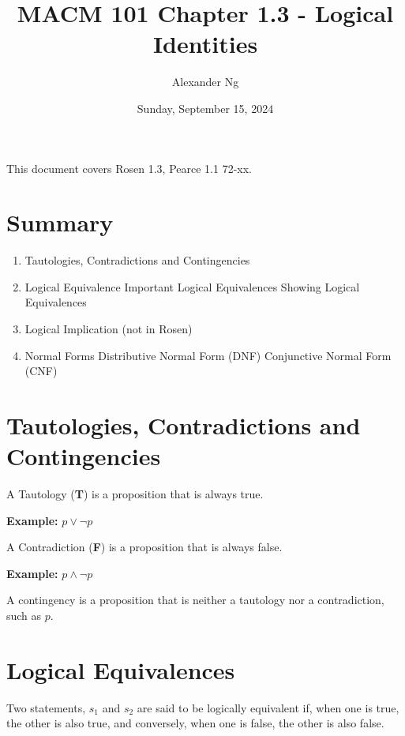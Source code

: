 \documentclass[12pt]{article}
\begin{document}
\title{MACM 101 Chapter 1.3 - Logical Identities}
\author{Alexander Ng}
\date{Sunday, September 15, 2024}

\maketitle

This document covers Rosen 1.3, Pearce 1.1 72-xx.

\section*{Summary}

\begin{enumerate}
\item Tautologies, Contradictions and Contingencies
\item Logical Equivalence
  \subitem Important Logical Equivalences
  \subitem Showing Logical Equivalences
\item Logical Implication (not in Rosen)
\item Normal Forms
  \subitem Distributive Normal Form (DNF)
  \subitem Conjunctive Normal Form (CNF)
\end{enumerate}


\pagebreak

\section{Tautologies, Contradictions and Contingencies}

\noindent

A Tautology (\textbf{T}) is a proposition that is always true.

\textbf{Example:} $p \lor \neg p$

A Contradiction (\textbf{F}) is a proposition that is always false.

\textbf{Example:} $p \land \neg p$

A contingency is a proposition that is neither a tautology nor a contradiction,
such as $p$.

\section{Logical Equivalences}

Two statements, $s_1$ and $s_2$ are said to be logically equivalent if, when one
is true, the other is also true, and conversely, when one is false, the other
is also false.
\end{document}
